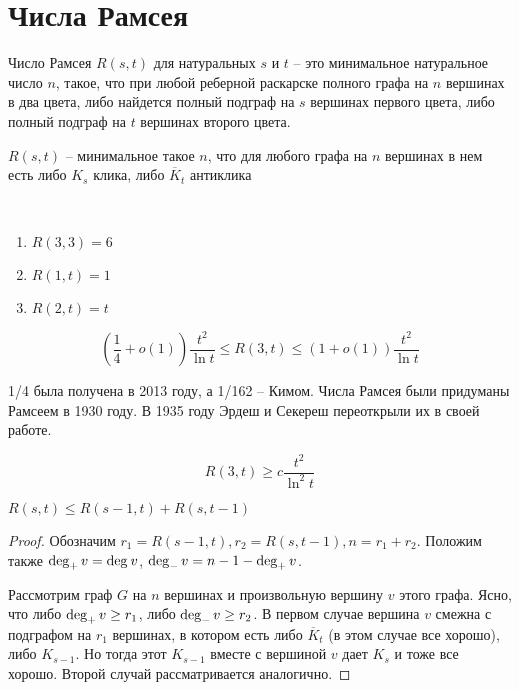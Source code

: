\documentclass[document.tex]{subfiles}
\begin{document}
\section{Числа Рамсея}
\begin{definition}
	Число Рамсея $R(s, t)$ для натуральных $s$ и $t$ -- это минимальное натуральное число $n$, такое, что при любой реберной раскарске полного графа на $n$ вершинах в два цвета, либо найдется полный подграф на $s$ вершинах первого цвета, либо полный подграф на $t$ вершинах второго цвета.
\end{definition}

\begin{definition}
	$R(s, t)$ -- минимальное такое $n$, что для любого графа на $n$ вершинах в нем есть либо $K_s$ клика, либо $\overline K_t$ антиклика
\end{definition}
\begin{example}
	~\begin{enumerate}
		\item $R(3, 3) = 6$
		\item $R(1, t) = 1$
		\item $R(2, t) = t$
	\end{enumerate}
\end{example}

\begin{statement}
	\[(
		\frac{1}{4} + o(1))\frac{t^2}{\ln t} \leq R(3, t) \leq (1 + o(1))\frac{t^2}{\ln t}
	\]
\end{statement}

\begin{remark}
	1/4 была получена в 2013 году, а 1/162 -- Кимом. Числа Рамсея были придуманы Рамсеем в 1930 году. В 1935 году Эрдеш и Секереш переоткрыли их в своей работе.
\end{remark}

\begin{statement}
	\[
		R(3, t) \geq c \frac{t^2}{\ln^2 t}
	\]
\end{statement}

\begin{theorem}
	$R(s, t) \leq R(s-1, t) + R(s, t-1)$
\end{theorem}

\begin{proof}
	Обозначим $r_1 = R(s - 1, t), r_2 = R(s, t - 1), n = r_1 + r_2$. Положим также $\operatorname{deg}_{+} v = \operatorname{deg}_{} v$, $\operatorname{deg}_{-} v = n - 1 - \operatorname{deg}_{+} v$.

	Рассмотрим граф $G$ на $n$ вершинах и произвольную вершину $v$ этого графа. Ясно, что либо $\operatorname{deg}_{+} v \geq r_1$, либо $\operatorname{deg}_{-} v \geq r_2$. В первом случае вершина $v$ смежна с подграфом на $r_1$ вершинах, в котором есть либо $\overline K_t$ (в этом случае все хорошо), либо $K_{s - 1}$. Но тогда этот $K_{s - 1}$ вместе с вершиной $v$ дает $K_s$ и тоже все хорошо. Второй случай рассматривается аналогично. 
\end{proof}
\end{document}
